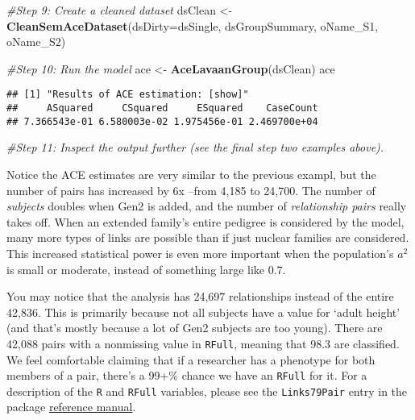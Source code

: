 \documentclass[smallextended]{svjour3}       %
\newenvironment{Shaded}{\begin{snugshade}}{\end{snugshade}}
\newcommand{\CommentTok}[1]{\textcolor[rgb]{0.56,0.35,0.01}{\textit{#1}}}
\newcommand{\DataTypeTok}[1]{\textcolor[rgb]{0.13,0.29,0.53}{#1}}
\newcommand{\KeywordTok}[1]{\textcolor[rgb]{0.13,0.29,0.53}{\textbf{#1}}}
\newcommand{\NormalTok}[1]{#1}
\newcommand{\StringTok}[1]{\textcolor[rgb]{0.31,0.60,0.02}{#1}}
\begin{document}
\begin{Shaded}
\begin{Highlighting}[]
\CommentTok{#Step 9: Create a cleaned dataset}
\NormalTok{dsClean <-}\StringTok{ }\KeywordTok{CleanSemAceDataset}\NormalTok{(}\DataTypeTok{dsDirty=}\NormalTok{dsSingle, dsGroupSummary, oName_S1, oName_S2)}

\CommentTok{#Step 10: Run the model}
\NormalTok{ace <-}\StringTok{ }\KeywordTok{AceLavaanGroup}\NormalTok{(dsClean)}
\NormalTok{ace}
\end{Highlighting}
\end{Shaded}

\begin{verbatim}
## [1] "Results of ACE estimation: [show]"
##     ASquared     CSquared     ESquared    CaseCount 
## 7.366543e-01 6.580003e-02 1.975456e-01 2.469700e+04
\end{verbatim}

\begin{Shaded}
\begin{Highlighting}[]
\CommentTok{#Step 11: Inspect the output further (see the final step two examples above).}
\end{Highlighting}
\end{Shaded}

Notice the ACE estimates are very similar to the previous exampl, but
the number of pairs has increased by 6x --from 4,185 to 24,700. The
number of \emph{subjects} doubles when Gen2 is added, and the number of
\emph{relationship pairs} really takes off. When an extended family's
entire pedigree is considered by the model, many more types of links are
possible than if just nuclear families are considered. This increased
statistical power is even more important when the population's \(a^2\)
is small or moderate, instead of something large like 0.7.

You may notice that the analysis has 24,697 relationships instead of the
entire 42,836. This is primarily because not all subjects have a value
for `adult height' (and that's mostly because a lot of Gen2 subjects are
too young). There are 42,088 pairs with a nonmissing value in
\texttt{RFull}, meaning that 98.3 are classified. We feel comfortable
claiming that if a researcher has a phenotype for both members of a
pair, there's a 99+\% chance we have an \texttt{RFull} for it. For a
description of the \texttt{R} and \texttt{RFull} variables, please see
the \texttt{Links79Pair} entry in the package
\href{https://cran.r-project.org/package=NlsyLinks/NlsyLinks.pdf}{reference
manual}.
\end{document}
